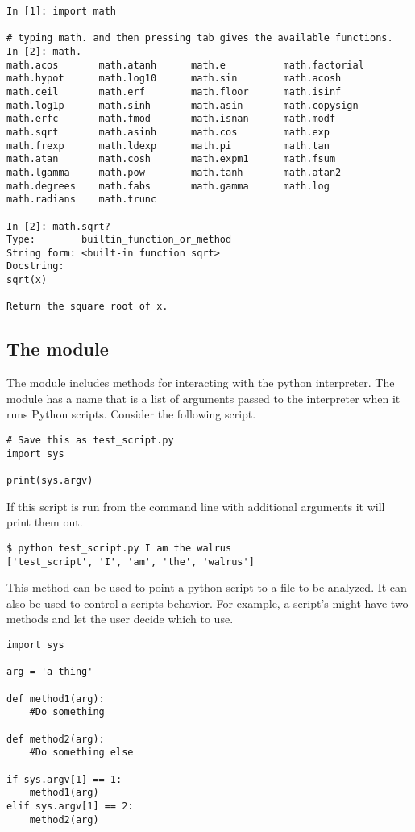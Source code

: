 \begin{lstlisting}
In [1]: import math

# typing math. and then pressing tab gives the available functions.
In [2]: math.
math.acos       math.atanh      math.e          math.factorial  
math.hypot      math.log10      math.sin        math.acosh      
math.ceil       math.erf        math.floor      math.isinf      
math.log1p      math.sinh       math.asin       math.copysign   
math.erfc       math.fmod       math.isnan      math.modf       
math.sqrt       math.asinh      math.cos        math.exp        
math.frexp      math.ldexp      math.pi         math.tan        
math.atan       math.cosh       math.expm1      math.fsum       
math.lgamma     math.pow        math.tanh       math.atan2      
math.degrees    math.fabs       math.gamma      math.log        
math.radians    math.trunc

In [2]: math.sqrt?
Type:        builtin_function_or_method
String form: <built-in function sqrt>
Docstring:
sqrt(x)

Return the square root of x.
\end{lstlisting}

\subsection*{The  module}

The  module includes methods for interacting with the python interpreter.
The module has a name  that is a list of arguments passed to the interpreter when it runs Python scripts.
Consider the following script.

\begin{lstlisting}
# Save this as test_script.py
import sys

print(sys.argv)
\end{lstlisting}

If this script is run from the command line with additional arguments it will print them out.

\begin{lstlisting}
$ python test_script.py I am the walrus
['test_script', 'I', 'am', 'the', 'walrus']
\end{lstlisting}

This method can be used to point a python script to a file to be analyzed.
It can also be used to control a scripts behavior.
For example, a script's might have two methods and let the user decide which to use.
\begin{lstlisting}
import sys

arg = 'a thing'

def method1(arg):
	#Do something

def method2(arg):
	#Do something else

if sys.argv[1] == 1:
	method1(arg)
elif sys.argv[1] == 2:
	method2(arg)
\end{lstlisting}

